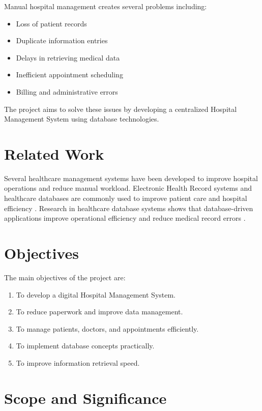\documentclass[conference]{IEEEtran}
\begin{document}
Manual hospital management creates several problems including:

\begin{itemize}
    \item Loss of patient records
    \item Duplicate information entries
    \item Delays in retrieving medical data
    \item Inefficient appointment scheduling
    \item Billing and administrative errors
\end{itemize}

The project aims to solve these issues by developing a centralized Hospital Management System using database technologies.

\section{Related Work}

Several healthcare management systems have been developed to improve hospital operations and reduce manual workload. Electronic Health Record systems and healthcare databases are commonly used to improve patient care and hospital efficiency \cite{ref2}. Research in healthcare database systems shows that database-driven applications improve operational efficiency and reduce medical record errors \cite{ref3}.

\section{Objectives}

The main objectives of the project are:

\begin{enumerate}
    \item To develop a digital Hospital Management System.
    \item To reduce paperwork and improve data management.
    \item To manage patients, doctors, and appointments efficiently.
    \item To implement database concepts practically.
    \item To improve information retrieval speed.
\end{enumerate}

\section{Scope and Significance}
\end{document}
